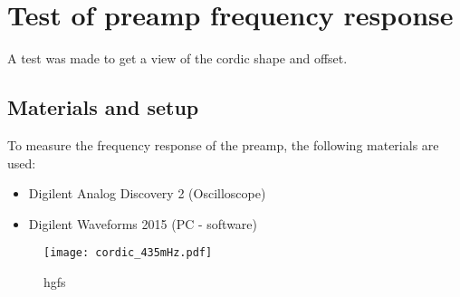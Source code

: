 \chapter{Test of preamp frequency response}\label{app:preamp_frequency_response}
A test was made to get a view of the cordic shape and offset.

\section*{Materials and setup}
To measure the frequency response of the preamp, the following materials are used:
\begin{itemize}
\item Digilent Analog Discovery 2 (Oscilloscope)
\item Digilent Waveforms 2015 (PC - software)
\end{itemize}

\begin{figure}[htbp!]
	\centering
		\texttt{[image: cordic\_435mHz.pdf]}
		\caption{hgfs}
		\label{fig:appendix:cordic_435mHz}
\end{figure}